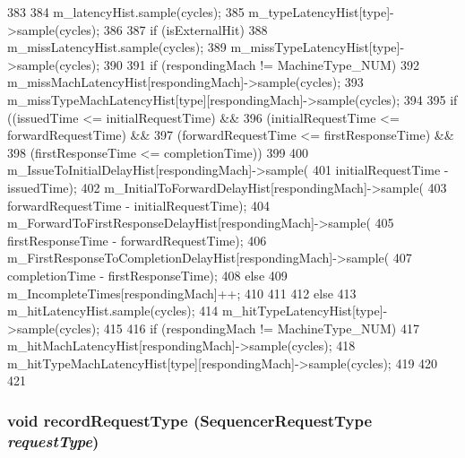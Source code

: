 \begin{DoxyCode}
383 {
384     m_latencyHist.sample(cycles);
385     m_typeLatencyHist[type]->sample(cycles);
386 
387     if (isExternalHit) {
388         m_missLatencyHist.sample(cycles);
389         m_missTypeLatencyHist[type]->sample(cycles);
390 
391         if (respondingMach != MachineType_NUM) {
392             m_missMachLatencyHist[respondingMach]->sample(cycles);
393             m_missTypeMachLatencyHist[type][respondingMach]->sample(cycles);
394 
395             if ((issuedTime <= initialRequestTime) &&
396                 (initialRequestTime <= forwardRequestTime) &&
397                 (forwardRequestTime <= firstResponseTime) &&
398                 (firstResponseTime <= completionTime)) {
399 
400                 m_IssueToInitialDelayHist[respondingMach]->sample(
401                     initialRequestTime - issuedTime);
402                 m_InitialToForwardDelayHist[respondingMach]->sample(
403                     forwardRequestTime - initialRequestTime);
404                 m_ForwardToFirstResponseDelayHist[respondingMach]->sample(
405                     firstResponseTime - forwardRequestTime);
406                 m_FirstResponseToCompletionDelayHist[respondingMach]->sample(
407                     completionTime - firstResponseTime);
408             } else {
409                 m_IncompleteTimes[respondingMach]++;
410             }
411         }
412     } else {
413         m_hitLatencyHist.sample(cycles);
414         m_hitTypeLatencyHist[type]->sample(cycles);
415 
416         if (respondingMach != MachineType_NUM) {
417             m_hitMachLatencyHist[respondingMach]->sample(cycles);
418             m_hitTypeMachLatencyHist[type][respondingMach]->sample(cycles);
419         }
420     }
421 }
\end{DoxyCode}
\hypertarget{classSequencer_a2fa76b7c47843db1ca8a852a1b4fdb49}{
\subsubsection[{recordRequestType}]{\setlength{\rightskip}{0pt plus 5cm}void recordRequestType (SequencerRequestType {\em requestType})}}
\label{classSequencer_a2fa76b7c47843db1ca8a852a1b4fdb49}



